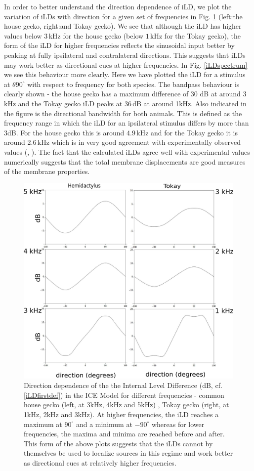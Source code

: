 In order to better understand the direction dependence of iLD, we plot the variation
of iLDs with direction for a given set of frequencies in Fig. \ref{iLDdirection} (left:the house gecko, right:and Tokay gecko). We see that although the 
iLD has higher values below $3\,$kHz for the house gecko (below $1\,$kHz for the Tokay gecko), the form of the iLD for higher frequencies reflects the sinusoidal input better by peaking at fully
ipsilateral and contralateral directions. This suggests that iLDs may work better as directional cues at higher frequencies. In Fig. \ref{iLDspectrum}
we see this behaviour more clearly. Here we have plotted the iLD for a stimulus at $\theta 90^\circ$ with respect to frequency for both species. The bandpass behaviour
is clearly shown - the house gecko has a maximum difference of $30$ dB at around $3\,$kHz and the Tokay gecko iLD peaks at $36\,$dB at around 1kHz. Also indicated in the figure is the directional bandwidth
for both animals. This is defined as the frequency range in which the iLD for an ipsilateral stimulus differs by more than 3dB. For the house gecko this is around $4.9\,$kHz and for the Tokay gecko it is around
$2.6\,$kHz which is in very good agreement with experimentally observed values (\cite{dalsgaardmanley1}, \cite{dalsgaardmanley2}). The fact that the calculated iLDs
agree well with experimental values numerically suggests that the total membrane displacements are good measures of the membrane properties.
\begin{figure}[ht!]
\centering
  \includegraphics[width=.75\linewidth]{Diagrams/Plots/iLD/all.png}
  \caption[Direction dependence of the Internal Level Difference for different frequencies.]{Direction dependence of the the Internal Level Difference (dB, cf. \eqref{iLDfirstdef}) in the ICE Model for different frequencies - common house gecko (left, at 3kHz, 4kHz and 5kHz)
  , Tokay gecko (right, at 1kHz, 2kHz and 3kHz). At higher frequencies, the iLD reaches a maximum at $90^\circ$ and a minimum at $-90^\circ$ whereas for lower frequencies, the maxima and minima are 
  reached before and after. This form of the above plots suggests that the iLDs cannot by themselves be used to localize sources in this regime and work better as directional cues at relatively higher frequencies.}
  \label{iLDdirection}
\end{figure}

